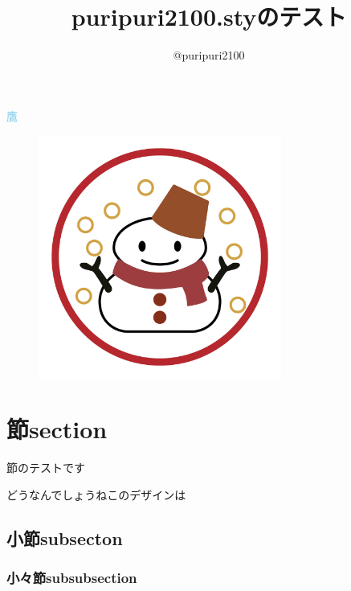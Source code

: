 \documentclass[titlepage]{ltjsarticle}
\begin{document}
\title{\textsf{puripuri2100.sty}のテスト}
\nonsubtitle
\author{@puripuri2100}
\nondate
\date{\puritoday}
\purimaketitle



\tableofcontents

\textcolor{SkyBlue}{鷹}
\begin{figure}[h]
\centering
\includegraphics[width=80mm]{aki.jpg}
\end{figure}


\section{節section}
節のテストです

どうなんでしょうねこのデザインは
\subsection{小節subsecton}
\subsubsection{小々節subsubsection}
\end{document}
